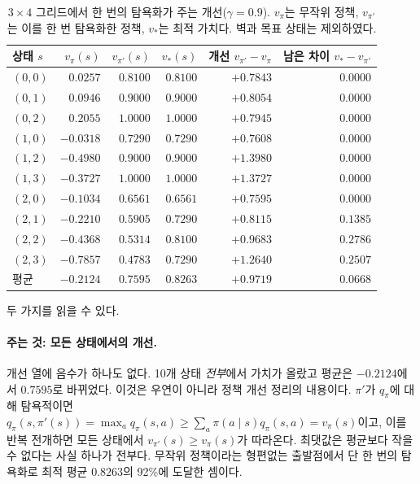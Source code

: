 \documentclass[11pt,a4paper]{article}
\begin{document}
\begin{table}[htbp]
\centering
\caption{$3\times4$ 그리드에서 한 번의 탐욕화가 주는 개선($\gamma=0.9$). $v_\pi$는 무작위 정책,
$v_{\pi'}$는 이를 한 번 탐욕화한 정책, $v_*$는 최적 가치다. 벽과 목표 상태는 제외하였다.}
\label{tab:greedy}
\small
\begin{tabular}{@{}lrrrrr@{}}
\toprule
상태 $s$ & $v_\pi(s)$ & $v_{\pi'}(s)$ & $v_*(s)$ & 개선 $v_{\pi'}-v_\pi$ & 남은 차이 $v_*-v_{\pi'}$ \\
\midrule
$(0,0)$ & $0.0257$  & $0.8100$ & $0.8100$ & $+0.7843$ & $0.0000$ \\
$(0,1)$ & $0.0946$  & $0.9000$ & $0.9000$ & $+0.8054$ & $0.0000$ \\
$(0,2)$ & $0.2055$  & $1.0000$ & $1.0000$ & $+0.7945$ & $0.0000$ \\
$(1,0)$ & $-0.0318$ & $0.7290$ & $0.7290$ & $+0.7608$ & $0.0000$ \\
$(1,2)$ & $-0.4980$ & $0.9000$ & $0.9000$ & $+1.3980$ & $0.0000$ \\
$(1,3)$ & $-0.3727$ & $1.0000$ & $1.0000$ & $+1.3727$ & $0.0000$ \\
$(2,0)$ & $-0.1034$ & $0.6561$ & $0.6561$ & $+0.7595$ & $0.0000$ \\
$(2,1)$ & $-0.2210$ & $0.5905$ & $0.7290$ & $+0.8115$ & $\mathbf{0.1385}$ \\
$(2,2)$ & $-0.4368$ & $0.5314$ & $0.8100$ & $+0.9683$ & $\mathbf{0.2786}$ \\
$(2,3)$ & $-0.7857$ & $0.4783$ & $0.7290$ & $+1.2640$ & $\mathbf{0.2507}$ \\
\midrule
평균     & $-0.2124$ & $0.7595$ & $0.8263$ & $+0.9719$ & $0.0668$ \\
\bottomrule
\end{tabular}
\end{table}

두 가지를 읽을 수 있다.

\paragraph{주는 것: 모든 상태에서의 개선.}
개선 열에 음수가 하나도 없다. 10개 상태 \emph{전부}에서 가치가 올랐고 평균은 $-0.2124$에서 $0.7595$로
바뀌었다. 이것은 우연이 아니라 정책 개선 정리의 내용이다. $\pi'$가 $q_\pi$에 대해 탐욕적이면
$q_\pi(s,\pi'(s)) = \max_a q_\pi(s,a) \ge \sum_a \pi(a\mid s) q_\pi(s,a) = v_\pi(s)$이고, 이를 반복
전개하면 모든 상태에서 $v_{\pi'}(s)\ge v_\pi(s)$가 따라온다. 최댓값은 평균보다 작을 수 없다는 사실
하나가 전부다. 무작위 정책이라는 형편없는 출발점에서 단 한 번의 탐욕화로 최적 평균 $0.8263$의 92\%에
도달한 셈이다.
\end{document}
